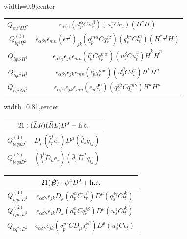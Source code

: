 \begin{table}[H]
\begin{center}
\begin{adjustbox}{width=0.9\textwidth,center}
\begin{minipage}[t]{7.6cm}
\begin{tabular}[t]{c|c}
%
$Q_{eu^2dH^2}$  &  $\epsilon_{\alpha\beta\gamma} (d_p^{\alpha} C u_r^{\beta}) (u_s^{\gamma} C e_t) (H^\dag H)$ \\ \hdashline
%
$Q_{lq^3H^2}^{(3)}$  &  $\epsilon_{\alpha\beta\gamma} \epsilon_{mn} (\epsilon \tau^I)_{jk} (q_p^{m\alpha} C q_r^{j\beta}) (q_s^{k\gamma} C l_t^n) (H^\dag \tau^I H)$ \\
%
$Q_{lqu^2H^2}$  &  $\epsilon_{\alpha\beta\gamma} \epsilon_{jk} \epsilon_{mn} (l_p^j C q_r^{m\alpha}) (u_s^\beta C u_t^\gamma) \widetilde H^k \widetilde H^n$ \\
%
$Q_{lqd^2H^2}$  &  $\epsilon_{\alpha\beta\gamma} \epsilon_{jk} \epsilon_{mn} (l_p^j q_r^{m\alpha}) (d_s^\beta C d_t^\gamma) H^k H^n$ \\
%
$Q_{eq^2dH^2}$  &  $\epsilon_{\alpha\beta\gamma} \epsilon_{jk} \epsilon_{mn} (e_p d_r^\alpha) (q_s^{j\beta} C q_t^{m\gamma}) H^k H^n$
\end{tabular}
\end{minipage}
\end{adjustbox}
\begin{adjustbox}{width=0.81\textwidth,center}
\small
\begin{minipage}[t]{4.4cm}
\renewcommand{\arraystretch}{1.5}
\begin{tabular}[t]{c|c}
\multicolumn{2}{c}{\boldmath$21:(\bar L R)(\bar R L)D^2 + \mathrm{h.c.}$} \\
\hline
$Q_{leqdD^2}^{(1)}$  &  $D_\mu (\bar l_p^j e_r) D^\mu (\bar d_s q_{tj})$  \\
%
$Q_{leqdD^2}^{(2)}$  &  $(\bar l_p^j \overleftrightarrow{D}_\mu e_r) (\bar d_s \overleftrightarrow{D}^\mu q_{tj})$  
\end{tabular}
\end{minipage}
\hspace{1cm}
\begin{minipage}[t]{6.7cm}
\renewcommand{\arraystretch}{1.5}
\begin{tabular}[t]{c|c}
\multicolumn{2}{c}{\boldmath$21(\slashed B):\psi^4D^2 + \mathrm{h.c.}$} \\
\hline
$Q_{lqudD^2}^{(1)}$  &  $\epsilon_{\alpha\beta\gamma} \epsilon_{jk} D_\mu (d_p^{\alpha} C u_r^{\beta}) D^\mu (q_s^{j\gamma} C l_t^k)$  \\
%
$Q_{lqudD^2}^{(2)}$  &  $\epsilon_{\alpha\beta\gamma} \epsilon_{jk} D_\mu (d_p^{\alpha} C q_r^{j\beta}) D^\mu (u_s^{\gamma} C l_t^k)$  \\
%
$Q_{eq^2uD^2}$  &  $\epsilon_{\alpha\beta\gamma} \epsilon_{jk} (q_p^{j\alpha} C D_\mu q_r^{k\beta}) D^\mu (u_s^{\gamma} C e_t)$  \\

\end{tabular}
\end{minipage}
\end{adjustbox}
\end{center}
\end{table}
